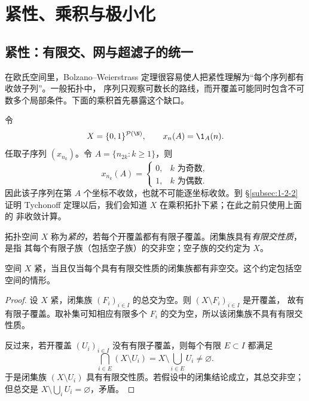 \section{紧性、乘积与极小化}\label{sec:01-02}

\subsection{紧性：有限交、网与超滤子的统一}\label{subsec:1-2-1}

在欧氏空间里，Bolzano--Weierstrass 定理很容易使人把紧性理解为“每个序列都有收敛子列”。一般拓扑中，
序列只观察可数长的路线，而开覆盖可能同时包含不可数多个局部条件。下面的乘积首先暴露这个缺口。

\begin{example}[一个没有收敛子列的坐标序列]\label{ex:1-2-1-1}
令
\[
 X=\{0,1\}^{\mathcal P(\N)},\qquad x_n(A)=\1_A(n).
\]
任取子序列 \((x_{n_k})\)。令 \(A=\{n_{2k}:k\ge1\}\)，则
\[
 x_{n_k}(A)=
 \begin{cases}
  0,&k\text{ 为奇数},\\
  1,&k\text{ 为偶数}.
 \end{cases}
\]
因此该子序列在第 \(A\) 个坐标不收敛，也就不可能逐坐标收敛。到
\S\ref{subsec:1-2-2} 证明 Tychonoff 定理以后，我们会知道 \(X\) 在乘积拓扑下紧；在此之前只使用上面的
非收敛计算。
\end{example}

\begin{definition}[紧空间]\label{def:1-2-1-1}
拓扑空间 \(X\) 称为\emph{紧的}，若每个开覆盖都有有限子覆盖。闭集族具有\emph{有限交性质}，是指
其每个有限子族（包括空子族）的交非空；空子族的交约定为 \(X\)。
\end{definition}

\begin{proposition}[开覆盖与有限交性质]\label{proposition:1-2-1-cover-fip}
空间 \(X\) 紧，当且仅当每个具有有限交性质的闭集族都有非空交。这个约定包括空空间的情形。
\end{proposition}
\begin{proof}
设 \(X\) 紧，闭集族 \((F_i)_{i\in I}\) 的总交为空。则 \((X\setminus F_i)_{i\in I}\) 是开覆盖，
故有有限子覆盖。取补集可知相应有限多个 \(F_i\) 的交为空，所以该闭集族不具有有限交性质。

反过来，若开覆盖 \((U_i)_{i\in I}\) 没有有限子覆盖，则每个有限 \(E\subset I\) 都满足
\[
 \bigcap_{i\in E}(X\setminus U_i)
 =X\setminus\bigcup_{i\in E}U_i\ne\varnothing.
\]
于是闭集族 \((X\setminus U_i)\) 具有有限交性质。若假设中的闭集结论成立，其总交非空；但总交是
\(X\setminus\bigcup_iU_i=\varnothing\)，矛盾。
\end{proof}

